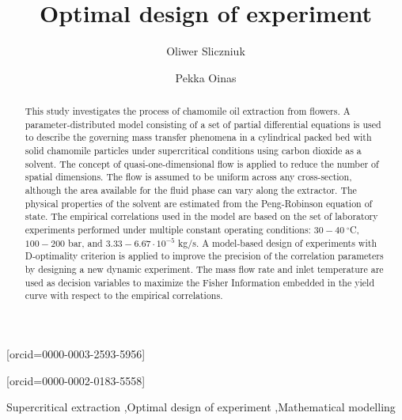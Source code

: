 \documentclass[a4paper,fleqn]{cas-dc}
\begin{document}
 

\title[mode=title]{Optimal design of experiment}                      


\author[1]{Oliwer Sliczniuk}[orcid=0000-0003-2593-5956]
\cormark[1]

\author[1]{Pekka Oinas}[orcid=0000-0002-0183-5558]


\address[1]{Aalto University, School of Chemical Engineering, Espoo, 02150, Finland}


\begin{abstract}
This study investigates the process of chamomile oil extraction from flowers. A parameter-distributed model consisting of a set of partial differential equations is used to describe the governing mass transfer phenomena in a cylindrical packed bed with solid chamomile particles under supercritical conditions using carbon dioxide as a solvent. The concept of quasi-one-dimensional flow is applied to reduce the number of spatial dimensions. The flow is assumed to be uniform across any cross-section, although the area available for the fluid phase can vary along the extractor. The physical properties of the solvent are estimated from the Peng-Robinson equation of state. The empirical correlations used in the model are based on the set of laboratory experiments performed under multiple constant operating conditions: $30 - 40~^\circ$C, $100 - 200$ bar, and $3.33-6.67 \cdot 10^{-5}$ kg/s. A model-based design of experiments with D-optimality criterion is applied to improve the precision of the correlation parameters by designing a new dynamic experiment. The mass flow rate and inlet temperature are used as decision variables to maximize the Fisher Information embedded in the yield curve with respect to the empirical correlations. 

\end{abstract}

\begin{keywords}
Supercritical extraction \sep Optimal design of experiment \sep Mathematical modelling
\end{keywords}
\end{document}
